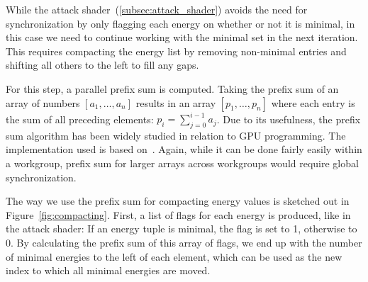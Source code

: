 While the attack shader~(\ref{subsec:attack_shader}) avoids the need for
synchronization by only flagging each energy on whether or not it is minimal,
in this case we need to continue working with the minimal set in the next
iteration.
This requires compacting the energy list by removing non-minimal
entries and shifting all others to the left to fill any gaps.

For this step, a parallel prefix sum is computed.
Taking the prefix sum of an array of numbers $[a_1, \ldots, a_n]$
results in an array $[p_1, \ldots, p_n]$ where each entry is the
sum of all preceding elements:
$p_i = \sum_{j = 0}^{i - 1} a_j$.
Due to its usefulness, the prefix sum algorithm has been widely studied in
relation to GPU programming.
The implementation used is based on~\cite{Harris2011ParallelPS}.
Again, while it can be done fairly easily within a workgroup,
prefix sum for larger arrays across workgroups would require global
synchronization.

The way we use the prefix sum for compacting energy values is sketched out
in Figure~\ref{fig:compacting}.
First, a list of flags for each energy is produced, like in the attack shader:
If an energy tuple is minimal, the flag is set to 1, otherwise to 0.
By calculating the prefix sum of this array of flags,
we end up with the number of minimal energies to the left of each element,
which can be used as the new index to which all minimal energies are moved.

